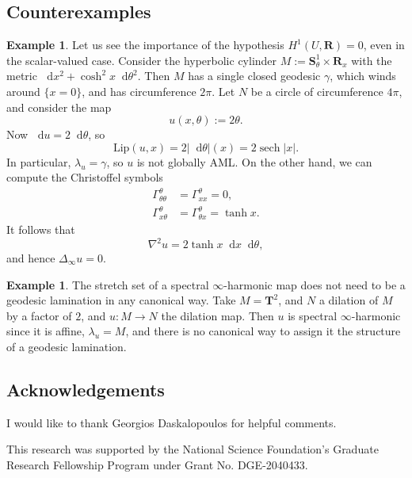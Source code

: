 \documentclass[reqno,11pt]{amsart}
\newcommand{\RR}{\mathbf{R}}
\newcommand{\Torus}{\mathbf T}
\newcommand{\Sph}{\mathbf S}
\newcommand{\Ball}{\mathbf{B}}
\newcommand*\dif{\mathop{}\!\mathrm{d}}
\DeclareMathOperator{\sech}{sech}
\newcommand{\Lip}{\mathrm{Lip}}
\theoremstyle{definition}
\newtheorem{example}[theorem]{Example}
\numberwithin{equation}{section}
\begin{document}
\subsection{Counterexamples}
\begin{example}
Let us see the importance of the hypothesis $H^1(U, \RR) = 0$, even in the scalar-valued case.
Consider the hyperbolic cylinder $M := \Sph^1_\theta \times \RR_x$ with the metric $\dif x^2 + \cosh^2 x \dif \theta^2$.
Then $M$ has a single closed geodesic $\gamma$, which winds around $\{x = 0\}$, and has circumference $2\pi$.
Let $N$ be a circle of circumference $4\pi$, and consider the map 
$$u(x, \theta) := 2\theta.$$
Now $\dif u = 2 \dif \theta$, so
$$\Lip(u, x) = 2|\dif \theta|(x) = 2 \sech |x|.$$
In particular, $\lambda_u = \gamma$, so $u$ is not globally AML.
On the other hand, we can compute the Christoffel symbols
\begin{align*}
\Gamma^\theta_{\theta \theta} &= \Gamma^\theta_{x x} = 0, \\
\Gamma^\theta_{x \theta} &= \Gamma^\theta_{\theta x} = \tanh x.
\end{align*}
It follows that 
$$\nabla^2 u = 2 \tanh x \dif x \dif \theta,$$
and hence $\Delta_\infty u = 0$.
\end{example}

\begin{example}
The stretch set of a spectral $\infty$-harmonic map does not need to be a geodesic lamination in any canonical way.
Take $M = \Torus^2$, and $N$ a dilation of $M$ by a factor of $2$, and $u: M \to N$ the dilation map.
Then $u$ is spectral $\infty$-harmonic since it is affine, $\lambda_u = M$, and there is no canonical way to assign it the structure of a geodesic lamination.
\end{example}

\subsection{Acknowledgements}
I would like to thank Georgios Daskalopoulos for helpful comments.

This research was supported by the National Science Foundation's Graduate Research Fellowship Program under Grant No. DGE-2040433.

\end{document}
